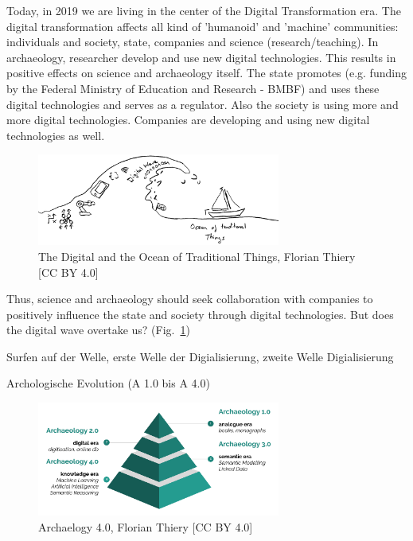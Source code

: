 \documentclass[twocolumn]{autart}
\begin{document}
Today, in 2019 we are living in the center of the Digital Transformation era. The digital transformation affects all kind of 'humanoid' and 'machine' communities: individuals and society, state, companies and science (research/teaching). In archaeology, researcher develop and use new digital technologies. This results in positive effects on science and archaeology itself. The state promotes (e.g. funding by the Federal Ministry of Education and Research - BMBF) and uses these digital technologies and serves as a regulator. Also the society is using more and more digital technologies. Companies are developing and using new digital technologies as well.

\begin{figure}[!htb]
\begin{center}
\includegraphics[width=8cm]{Digital_Wave_and_the_Ocean_of_Traditional_Things.png}
\caption{The Digital and the Ocean of Traditional Things, Florian Thiery [CC BY 4.0]}
\label{figdigitalwave}
\end{center}
\end{figure}

Thus, science and archaeology should seek collaboration with companies to positively influence the state and society through digital technologies. But does the digital wave overtake us? (Fig.~\ref{figdigitalwave})

Surfen auf der Welle, erste Welle der Digialisierung, zweite Welle Digialisierung

Archologische Evolution (A 1.0 bis A 4.0)

\begin{figure}[!htb]
\begin{center}
\includegraphics[width=8cm]{Archaeology_40.png}    %
\caption{Archaelogy 4.0, Florian Thiery [CC BY 4.0]}  %
\label{figa40pyramid}                                 %
\end{center}                                 %
\end{figure}
\end{document}
